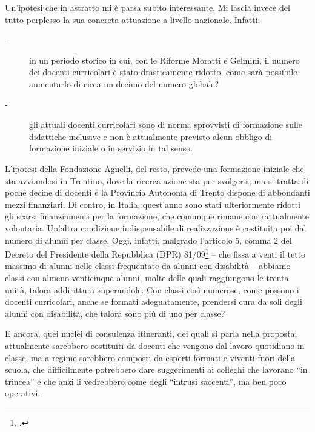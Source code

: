 Un'ipotesi che in astratto mi è parsa subito interessante. Mi lascia invece del tutto perplesso la sua concreta attuazione a livello nazionale. Infatti:
\begin{description}
	\item[-] in un periodo storico in cui, con le Riforme Moratti e Gelmini, il numero dei docenti curricolari è stato drasticamente ridotto, come sarà possibile aumentarlo di circa un decimo del numero globale?
	\item[-] gli attuali docenti curricolari sono  di norma sprovvisti di formazione sulle didattiche inclusive e non è attualmente previsto alcun obbligo di formazione iniziale o in servizio in tal senso.
\end{description}

L'ipotesi della Fondazione Agnelli, del resto, prevede una formazione iniziale che sta avviandosi in Trentino, dove la ricerca-azione sta per svolgersi; ma si tratta di poche decine di docenti e la Provincia Autonoma di Trento dispone di abbondanti mezzi finanziari. Di contro, in Italia, quest'anno sono stati ulteriormente ridotti gli scarsi finanziamenti per la formazione, che comunque rimane contrattualmente volontaria.
Un'altra condizione indispensabile di realizzazione è costituita poi dal numero di alunni per classe. Oggi, infatti, malgrado l'articolo 5, comma 2 del Decreto del Presidente della Repubblica (DPR) 81/09\footcite{DPR_81_2009} – che fissa a venti il tetto massimo di alunni nelle classi frequentate da alunni con disabilità – abbiamo classi con almeno venticinque alunni, molte delle quali raggiungono le trenta unità, talora addirittura superandole. Con classi così numerose, come possono i docenti curricolari, anche se formati adeguatamente, prendersi cura da soli degli alunni con disabilità, che talora sono più di uno per classe?

E ancora, quei nuclei di consulenza itineranti, dei quali si parla nella proposta, attualmente sarebbero costituiti da docenti che vengono dal lavoro quotidiano in classe, ma a regime sarebbero composti da esperti formati e viventi fuori della scuola, che difficilmente potrebbero dare suggerimenti ai colleghi che lavorano “in trincea” e che anzi li vedrebbero come degli “intrusi saccenti”, ma ben poco operativi.

